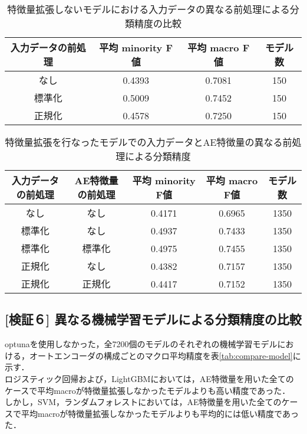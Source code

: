 \begin{table}[htbp]
    \caption{特徴量拡張しないモデルにおける入力データの異なる前処理による分類精度の比較}
    \label{tab:compare-preprocess}
    \centering
    \begin{tabular}{cccc}
        \hline
        入力データの前処理&平均 minority F値 & 平均 macro F値 & モデル数 \\ 
        \hline
        なし  & 0.4393& 0.7081 &150\\ 
        標準化  & 0.5009& 0.7452 &150\\ 
        正規化 & 0.4578& 0.7250  &150\\ 
        \hline
    \end{tabular}
\end{table}
\begin{table}[htbp]
    \caption{特徴量拡張を行なったモデルでの入力データとAE特徴量の異なる前処理による分類精度}
    \label{tab:compare-ae-preprocess}
    \centering
    \begin{tabular}{ccccc}
        \hline
        入力データの前処理& AE特徴量の前処理&平均 minority F値 & 平均 macro F値 & モデル数 \\ 
        \hline
        なし & なし & 0.4171& 0.6965 &1350\\ 
        標準化 & なし & 0.4937& 0.7433 &1350\\ 
        標準化 & 標準化 & 0.4975& 0.7455  &1350\\ 
        正規化 & なし & 0.4382& 0.7157  &1350\\ 
        正規化 & 正規化 & 0.4417& 0.7152  &1350\\ 
        \hline
    \end{tabular}
\end{table}

\subsection{[検証６] 異なる機械学習モデルによる分類精度の比較}
optunaを使用しなかった，全7200個のモデルのそれぞれの機械学習モデルにおける，オートエンコーダの構成ごとのマクロ平均精度を表\ref{tab:compare-model}に示す．\\
ロジスティック回帰および，LightGBMにおいては，AE特徴量を用いた全てのケースで平均macroが特徴量拡張しなかったモデルよりも高い精度であった．\\
しかし，SVM，ランダムフォレストにおいては，AE特徴量を用いた全てのケースで平均macroが特徴量拡張しなかったモデルよりも平均的には低い精度であった．\\


